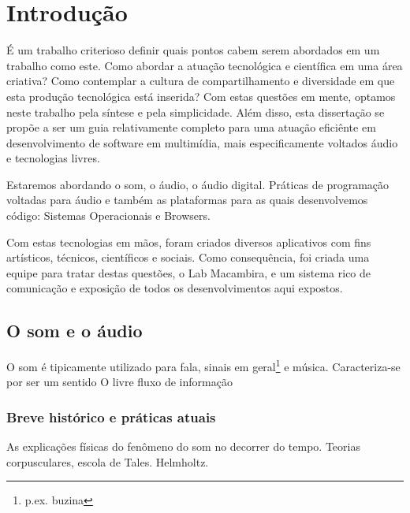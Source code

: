 \chapter{Introdução} %
\label{cap:intro} %

É um trabalho criterioso definir quais pontos cabem serem abordados em um trabalho como este.
Como abordar a atuação tecnológica e científica em uma área criativa? Como contemplar
a cultura de compartilhamento e diversidade em que esta produção tecnológica está inserida?
Com estas questões em mente, optamos neste trabalho pela síntese e pela simplicidade.
Além disso, esta dissertação se propõe a ser um guia relativamente completo para uma atuação eficiênte em desenvolvimento
de software em multimídia, mais especificamente voltados áudio e tecnologias livres.

Estaremos abordando o som, o áudio, o áudio digital. Práticas de programação voltadas para
áudio e também as plataformas para as quais desenvolvemos código: Sistemas Operacionais e Browsers.

Com estas tecnologias em mãos, foram criados diversos aplicativos com fins artísticos,
técnicos, científicos e sociais. Como consequência, foi criada uma equipe para tratar
destas questões, o Lab Macambira, e um sistema rico de comunicação e exposição de todos
os desenvolvimentos aqui expostos.


\section{O som e o áudio}

O som é tipicamente utilizado para fala, sinais em geral\footnote{p.ex. buzina} e música.
Caracteriza-se por ser um sentido   O livre fluxo de informação

\subsection{Breve histórico e práticas atuais}

As explicações físicas do fenômeno do som no decorrer do tempo. Teorias
corpusculares, escola de Tales. Helmholtz.

